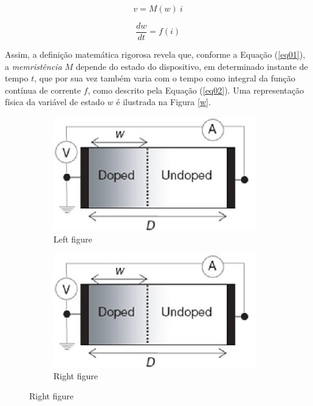 \documentclass{ceel}
\begin{document}
\begin{multicols}{2}
\begin{equation}\label{eq01}
v=M( w) \ i
\end{equation}

\begin{equation}\label{eq02}
\dfrac{dw}{dt} =f(i) 
\end{equation}

Assim, a definição matemática rigorosa revela que, conforme a Equação (\ref{eq01}), a \emph{memristência} $M$ depende do estado do dispositivo, em determinado instante de tempo $t$, que por sua vez também varia com o tempo como integral da função contínua de corrente $f$, como descrito pela Equação (\ref{eq02}).  Uma representação física da variável de estado $w$ é ilustrada na Figura \ref{w}. 


\begin{figure}[H]
\centering

\begin{subfigure}{0.49\columnwidth}
\centering
\includegraphics[width=\columnwidth]{memristor-w}
\caption{Left figure} \label{fig:left}
\end{subfigure}
\hfill
\begin{subfigure}{0.49\columnwidth}
\centering
\includegraphics[width=\columnwidth]{memristor-w}
\caption{Right figure} \label{fig:right}
\end{subfigure}


\end{figure}
\end{multicols}
\end{document}
